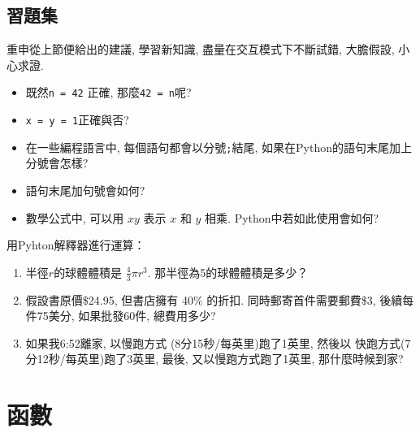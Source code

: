 \documentclass[10pt]{book}
\begin{document}
\section{習題集}

\begin{exercise}

重申從上節便給出的建議, 學習新知識, 
盡量在交互模式下不斷試錯, 大膽假設, 小心求證. 

\begin{itemize}

\item 既然{\tt n = 42} 正確, 那麼{\tt 42 = n}呢?

\item {\tt x = y = 1}正確與否?

\item 在一些編程語言中, 每個語句都會以分號{\tt ;}結尾, 
如果在Python的語句末尾加上分號會怎樣?

\item 語句末尾加句號會如何?

\item 數學公式中, 可以用 $x y$ 表示 $x$ 和 $y$ 相乘. Python中若如此使用會如何?

\end{itemize}

\end{exercise}


\begin{exercise}

用Pyhton解釋器進行運算： 

\begin{enumerate}

\item 半徑$r$的球體體積是 $\frac{4}{3} \pi r^3$. 那半徑為5的球體體積是多少？

\item 假設書原價\$24.95, 但書店擁有 40\% 的折扣. 
同時郵寄首件需要郵費\$3, 後續每件75美分, 
如果批發60件, 總費用多少?

\item 如果我6:52離家, 以慢跑方式 (8分15秒/每英里)跑了1英里, 然後以
快跑方式(7分12秒/每英里)跑了3英里, 最後, 又以慢跑方式跑了1英里, 
那什麼時候到家?

\end{enumerate}
\end{exercise}


\chapter{函數}
\label{funcchap}
\end{document}
